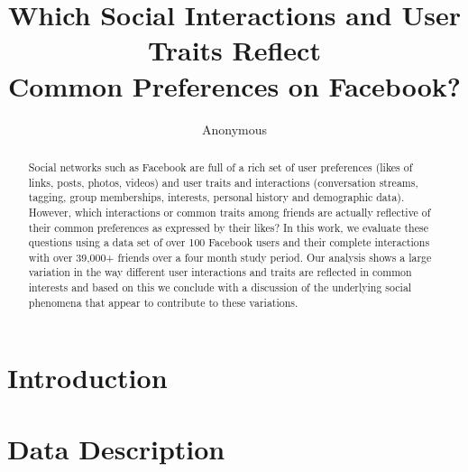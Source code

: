 \documentclass[letterpaper]{article}
\begin{document}
%
\title{Which Social Interactions and User Traits Reflect \\Common Preferences on Facebook?}
\author{Anonymous}

\maketitle
\begin{abstract}
Social networks such as Facebook are full of a rich set of user
preferences (likes of links, posts, photos, videos) and user traits
and interactions (conversation streams, tagging, group memberships,
interests, personal history and demographic data). However, which 
interactions or common traits among friends are actually reflective of
their common preferences as expressed by their likes?  In this work, we
evaluate these questions using a data set of over 100 Facebook users
and their complete interactions with over 39,000+ 
friends over a four month study period. Our analysis shows a large
variation in the way different user interactions and traits are
reflected in common interests and based on this we conclude with a
discussion of the underlying social phenomena that appear to
contribute to these variations.
\end{abstract}

\section{Introduction}



\section{Data Description}
\end{document}

